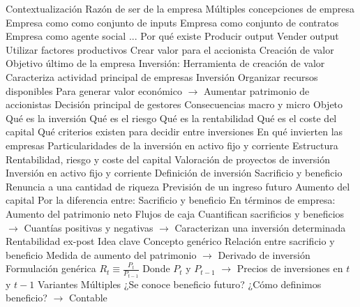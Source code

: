 \documentclass{nuevotema}
\begin{document}
\esquemalargo













\begin{esquemal}
	\1[] 
		\2 Contextualización
			\3 Razón de ser de la empresa
				\4 Múltiples concepciones de empresa
				\4[] Empresa como como conjunto de inputs
				\4[] Empresa como conjunto de contratos
				\4[] Empresa como agente social
				\4[] ...
				\4 Por qué existe
				\4[] Producir output
				\4[] Vender output
				\4[] Utilizar factores productivos
				\4[] Crear valor para el accionista
			\3 Creación de valor
				\4 Objetivo último de la empresa
				\4 Inversión:
				\4[] Herramienta de creación de valor
				\4[] Caracteriza actividad principal de empresas
			\3 Inversión
				\4 Organizar recursos disponibles
				\4[] Para generar valor económico
				\4[] $\to$ Aumentar patrimonio de accionistas
				\4 Decisión principal de gestores
				\4 Consecuencias macro y micro
		\2 Objeto
			\3 Qué es la inversión
			\3 Qué es el riesgo
			\3 Qué es la rentabilidad
			\3 Qué es el coste del capital
			\3 Qué criterios existen para decidir entre inversiones
			\3 En qué invierten las empresas
			\3 Particularidades de la inversión en activo fijo y corriente
		\2 Estructura
			\3 Rentabilidad, riesgo y coste del capital
			\3 Valoración de proyectos de inversión
			\3 Inversión en activo fijo y corriente
	\1 
		\2 Definición de inversión
			\3 Sacrificio y beneficio
				\4 Renuncia a una cantidad de riqueza
				\4 Previsión de un ingreso futuro
			\3 Aumento del capital
				\4 Por la diferencia entre:
				\4[] Sacrificio y beneficio
				\4 En términos de empresa:
				\4[] Aumento del patrimonio neto
			\3 Flujos de caja
				\4 Cuantifican sacrificios y beneficios
				\4[] $\to$ Cuantías positivas y negativas
				\4[] $\to$ Caracterizan una inversión determinada
		\2 Rentabilidad ex-post
			\3 Idea clave
				\4 Concepto genérico
				\4 Relación entre sacrificio y beneficio
				\4[] Medida de aumento del patrimonio
				\4[] $\to$ Derivado de inversión
			\3 Formulación genérica
				\4 $R_t \equiv \frac{P_{t}}{P_{t-1}}$
				\4[] Donde $P_{t}$ y $P_{t-1}$
				\4[] $\to$ Precios de inversiones en $t$ y $t-1$
			\3 Variantes
				\4 Múltiples
				\4[] ¿Se conoce beneficio futuro?
				\4[] ¿Cómo definimos beneficio?
				\4[] $\to$ Contable

\end{esquemal}
\end{document}
